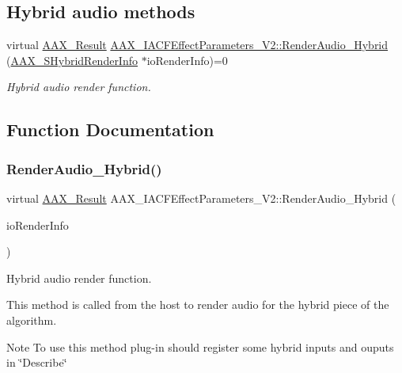 \subsection*{Hybrid audio methods}
\begin{DoxyCompactItemize}
\item 
virtual \mbox{\hyperlink{a00392_a4d8f69a697df7f70c3a8e9b8ee130d2f}{A\+A\+X\+\_\+\+Result}} \mbox{\hyperlink{a00805_gae6139041de22f51f3146d26a01c54c1b}{A\+A\+X\+\_\+\+I\+A\+C\+F\+Effect\+Parameters\+\_\+\+V2\+::\+Render\+Audio\+\_\+\+Hybrid}} (\mbox{\hyperlink{a01673}{A\+A\+X\+\_\+\+S\+Hybrid\+Render\+Info}} $\ast$io\+Render\+Info)=0
\begin{DoxyCompactList}\small\item\em Hybrid audio render function. \end{DoxyCompactList}\end{DoxyCompactItemize}


\subsection{Function Documentation}
\mbox{\label{a00805_gae6139041de22f51f3146d26a01c54c1b}} 
\subsubsection{\texorpdfstring{RenderAudio\_Hybrid()}{RenderAudio\_Hybrid()}}
{\footnotesize\ttfamily virtual \mbox{\hyperlink{a00392_a4d8f69a697df7f70c3a8e9b8ee130d2f}{A\+A\+X\+\_\+\+Result}} A\+A\+X\+\_\+\+I\+A\+C\+F\+Effect\+Parameters\+\_\+\+V2\+::\+Render\+Audio\+\_\+\+Hybrid (\begin{DoxyParamCaption}\item[{\mbox{\hyperlink{a01673}{A\+A\+X\+\_\+\+S\+Hybrid\+Render\+Info}} $\ast$}]{io\+Render\+Info }\end{DoxyParamCaption})\hspace{0.3cm}{\ttfamily [pure virtual]}}



Hybrid audio render function. 

This method is called from the host to render audio for the hybrid piece of the algorithm.

\begin{DoxyNote}{Note}
To use this method plug-\/in should register some hybrid inputs and ouputs in \char`\"{}\+Describe\char`\"{} 
\end{DoxyNote}


